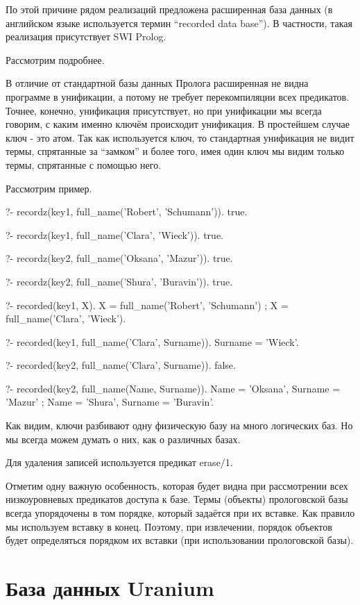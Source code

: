 \documentclass[a4paper]{book}
\def\ur{Uranium}
\begin{document}
По этой причине рядом реализаций предложена расширенная база
данных (в английском языке используется термин ``recorded data
base''). В частности, такая реализация присутствует SWI Prolog.

Рассмотрим подробнее.

В отличие от стандартной базы данных Пролога расширенная не видна
программе в унификации, а потому не требует перекомпиляции всех
предикатов. Точнее, конечно, унификация присутствует, но при
унификации мы всегда говорим, с каким именно ключём происходит
унификация. В простейшем случае ключ - это атом. Так как
используется ключ, то стандартная унификация не видит термы,
спрятанные за ``замком'' и более того, имея один ключ мы видим
только термы, спрятанные с помощью него.

Рассмотрим пример.

\begin{example}{}{}
?- recordz(key1, full_name('Robert', 'Schumann')).
true.

?- recordz(key1, full_name('Clara', 'Wieck')).
true.

?- recordz(key2, full_name('Oksana', 'Mazur')).
true.

?- recordz(key2, full_name('Shura', 'Buravin')).
true.

?- recorded(key1, X).
X = full_name('Robert', 'Schumann') ;
X = full_name('Clara', 'Wieck').

?- recorded(key1, full_name('Clara', Surname)).
Surname = 'Wieck'.

?- recorded(key2, full_name('Clara', Surname)).
false.

?- recorded(key2, full_name(Name, Surname)).
Name = 'Oksana',
Surname = 'Mazur' ;
Name = 'Shura',
Surname = 'Buravin'.
\end{example}

Как видим, ключи разбивают одну физическую базу на много
логических баз. Но мы всегда можем думать о них, как о различных
базах.

Для удаления записей используется предикат erase/1.

Отметим одну важную особенность, которая будет видна при
рассмотрении всех низкоуровневых предикатов доступа к базе. Термы
(объекты) прологовской базы всегда упорядочены в том порядке,
который задаётся при их вставке. Как правило мы используем
вставку в конец. Поэтому, при извлечении, порядок объектов будет
определяться порядком их вставки (при использовании прологовской
базы).

\section{База данных \ur}
\end{document}
